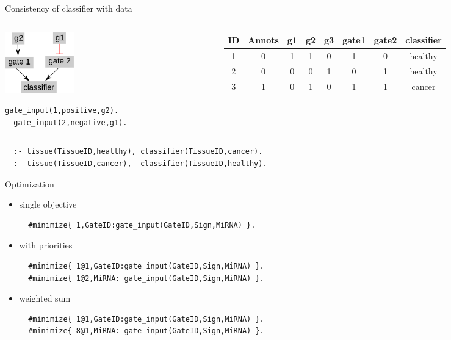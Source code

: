 \documentclass[10pt,dvipsnames]{beamer}
\begin{document}
\begin{frame}[fragile]{Consistency of classifier with data}
 \begin{columns}  
 \begin{column}{0.25\textwidth}
 \includegraphics[width=3cm]{constraints_07.png}
 \color{my_example_color}
  \begin{Verbatim}[fontsize=\small]
  gate_input(1,positive,g2).
  gate_input(2,negative,g1).
  \end{Verbatim}
 \end{column}
 \begin{column}{0.8\textwidth}
 \begin{tabular}{|c|c|c|c|c|c|c|c|}
  \hline
  ID&	Annots&	g1&	g2&	g3& gate1& gate2& classifier\\
  \hline
  1&	0&	1&	1&	0& 1& 0& healthy\\
  2&	0&	0&	0&	1& 0& 1& healthy\\
  3&	1&	0&	1&	0& 1& 1& cancer\\
  \hline
 \end{tabular}
 \end{column}
 \end{columns}
 \vspace{1.5cm}
  \begin{verbatim}
  :- tissue(TissueID,healthy), classifier(TissueID,cancer).
  :- tissue(TissueID,cancer),  classifier(TissueID,healthy).
 \end{verbatim}
\end{frame}



\begin{frame}[fragile]{Optimization}
 \begin{itemize}
  \item single objective
  \begin{verbatim}
  #minimize{ 1,GateID:gate_input(GateID,Sign,MiRNA) }.
 \end{verbatim}
  \item with priorities
  \begin{verbatim}
  #minimize{ 1@1,GateID:gate_input(GateID,Sign,MiRNA) }.
  #minimize{ 1@2,MiRNA: gate_input(GateID,Sign,MiRNA) }.
 \end{verbatim}
  \item weighted sum
  \begin{verbatim}
  #minimize{ 1@1,GateID:gate_input(GateID,Sign,MiRNA) }.
  #minimize{ 8@1,MiRNA: gate_input(GateID,Sign,MiRNA) }.
 \end{verbatim}
 \end{itemize}
\end{frame}
\end{document}
